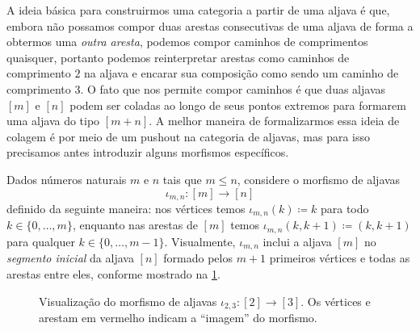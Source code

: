 A ideia básica para construirmos uma categoria a partir de uma aljava é que, embora não possamos compor duas arestas consecutivas de uma aljava de forma a obtermos uma \emph{outra aresta}, podemos compor caminhos de comprimentos quaisquer, portanto podemos reinterpretar arestas como caminhos de comprimento $2$ na aljava e encarar sua composição como sendo um caminho de comprimento $3$.
O fato que nos permite compor caminhos é que duas aljavas $[m]$ e $[n]$ podem ser coladas ao longo de seus pontos extremos para formarem uma aljava do tipo $[m+n]$.
A melhor maneira de formalizarmos essa ideia de colagem é por meio de um pushout na categoria de aljavas, mas para isso precisamos antes introduzir alguns morfismos específicos.

Dados números naturais $m$ e $n$ tais que $m \leq n$, considere o morfismo de aljavas
\begin{displaymath}
    \iota_{m,n}: [m] \to [n]
\end{displaymath}
definido da seguinte maneira: nos vértices temos $\iota_{m,n}(k) \coloneqq k$ para todo $k \in \{0,\dots,m\}$, enquanto nas arestas de $[m]$ temos $\iota_{m,n}(k,k+1) \coloneqq (k,k+1)$ para qualquer $k \in \{0,\dots,m-1\}$.
Visualmente, $\iota_{m,n}$ inclui a aljava $[m]$ no \emph{segmento inicial} da aljava $[n]$ formado pelos $m+1$ primeiros vértices e todas as arestas entre eles, conforme mostrado na \cref{fig:morfismo_aljavas_segmento_inicial}.

\begin{figure}[h]
    \centering
    \caption{Visualização do morfismo de aljavas $\iota_{2,3}: [2] \to [3]$. Os vértices e arestam em vermelho indicam a ``imagem'' do morfismo.}
    \label{fig:morfismo_aljavas_segmento_inicial}
\end{figure}

